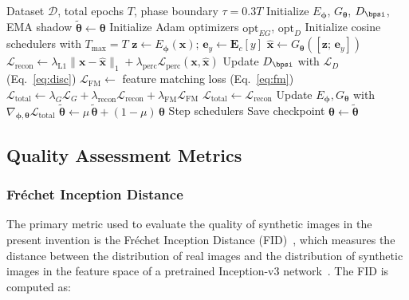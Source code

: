 \documentclass[12pt,letterpaper]{article}
\newcommand{\bz}{\mathbf{z}}
\newcommand{\bx}{\mathbf{x}}
\newcommand{\btheta}{\bm{\theta}}
\newcommand{\bphi}{\bm{\phi}}
\begin{document}
\begin{algorithm}[H]
\caption{End-to-End Training Procedure}
\label{alg:train}
\begin{algorithmic}[1]
\Require Dataset $\mathcal{D}$, total epochs $T$, phase boundary $\tau = 0.3T$
\State Initialize $E_{\bphi}$, $G_{\btheta}$, $D_{\bpsi}$, EMA shadow $\tilde{\btheta} \leftarrow \btheta$
\State Initialize Adam optimizers $\text{opt}_{EG}$, $\text{opt}_D$
\State Initialize cosine schedulers with $T_{\max} = T$
  \For{each minibatch $(\bx, y) \sim \mathcal{D}$}
    \State $\bz \leftarrow E_{\bphi}(\bx)$; $\bm{e}_y \leftarrow \mathbf{E}_c[y]$
    \State $\hat{\bx} \leftarrow G_{\btheta}([\bz;\,\bm{e}_y])$
    \State $\mathcal{L}_{\text{recon}} \leftarrow \lambda_{\text{L1}}\|\bx - \hat{\bx}\|_1 + \lambda_{\text{perc}}\mathcal{L}_{\text{perc}}(\bx, \hat{\bx})$
     
        \State Update $D_{\bpsi}$ with $\mathcal{L}_D$ (Eq.~\ref{eq:disc})
      \EndFor
      \State $\mathcal{L}_{\text{FM}} \leftarrow$ feature matching loss (Eq.~\ref{eq:fm})
      \State $\mathcal{L}_{\text{total}} \leftarrow \lambda_G \mathcal{L}_G + \lambda_{\text{recon}}\mathcal{L}_{\text{recon}} + \lambda_{\text{FM}}\mathcal{L}_{\text{FM}}$
    \Else
      \State $\mathcal{L}_{\text{total}} \leftarrow \mathcal{L}_{\text{recon}}$
    \EndIf
    \State Update $E_{\bphi}, G_{\btheta}$ with $\nabla_{\bphi,\btheta}\mathcal{L}_{\text{total}}$
      \State $\tilde{\btheta} \leftarrow \mu\,\tilde{\btheta} + (1-\mu)\,\btheta$ 
    \EndIf
  \EndFor
  \State Step schedulers
  \State Save checkpoint
\EndFor
\State $\btheta \leftarrow \tilde{\btheta}$ 
\end{algorithmic}
\end{algorithm}

\subsection{Quality Assessment Metrics}

\subsubsection{Fr\'{e}chet Inception Distance}

The primary metric used to evaluate the quality of synthetic images in the
present invention is the Fr\'{e}chet Inception Distance
(FID)~\cite{heusel2017}, which measures the distance between the distribution
of real images and the distribution of synthetic images in the feature space
of a pretrained Inception-v3 network~\cite{szegedy2016}. The FID is computed
as:
\end{document}
